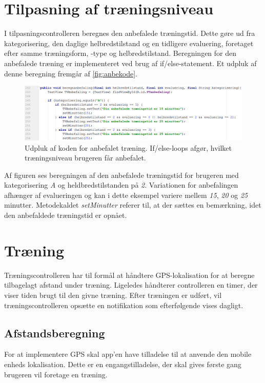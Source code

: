\section{Tilpasning af træningsniveau}
I tilpasningscontrolleren beregnes den anbefalede træningstid. Dette gøre ud fra kategorisering, den daglige helbredstilstand og en tidligere evaluering, foretaget efter samme træningsform, -type og helbredstilstand.
Beregningen for den anbefalede træning er implementeret ved brug af if/else-statement. Et udpluk af denne beregning fremgår af \autoref{fig:anbekode}.  
   
\begin{figure} [H]
\centering
\includegraphics[width=1\textwidth]{figures/imple/anbekode}
\caption{Udpluk af koden for anbefalet træning. If/else-loops afgør, hvilket træningsniveau brugeren får anbefalet.}
\label{fig:anbekode}
\end{figure} 

\noindent
Af figuren ses beregningen af den anbefalede træningstid for brugeren med kategorisering \textit{A} og heldbredstilstanden på \textit{2}. Variationen for anbefalingen afhænger af evalueringen og kan i dette eksempel variere mellem \textit{15}, \textit{20} og \textit{25}  minutter. Metodekaldet \textit{setMinutter} referer til, at der sættes en bemærkning, idet den anbefaldede træningstid er opnået.

\section{Træning}
Træningscontrolleren har til formål at håndtere GPS-lokalisation for at beregne tilbagelagt afstand under træning. Ligeledes håndterer controlleren en timer, der viser tiden brugt til den givne træning. Efter træningen er udført, vil træningscontrolleren opsætte en notifikation som efterfølgende vises dagligt. 


\subsection{Afstandsberegning}
For at implementere GPS skal app'en have tilladelse til at anvende den mobile enheds lokalisation. Dette er en engangstilladelse, der skal gives første gang brugeren vil foretage en træning. 

